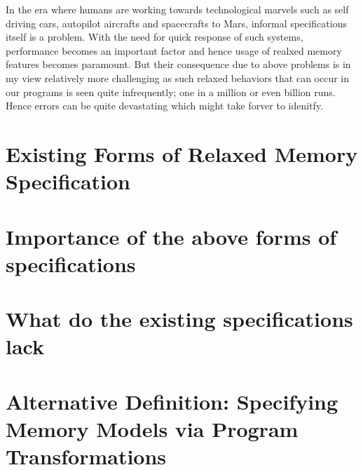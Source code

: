 \documentclass{article}
\begin{document}
        In the era where humans are working towards technological marvels such as self driving cars, autopilot aircrafts and spacecrafts to Mars, informal specifications itself is a problem. With the need for quick response of such systems, performance becomes an important factor and hence usage of realxed memory features becomes paramount. But their consequence due to above problems is in my view relatively more challenging as such relaxed behaviors that can occur in our programs is seen quite infrequently; one in a million or even billion runs. Hence errors can be quite devastating which might take forver to idenitfy.

    \section{Existing Forms of Relaxed Memory Specification}


    \section{Importance of the above forms of specifications}


    \section{What do the existing specifications lack}


    \section{Alternative Definition: Specifying Memory Models via Program Transformations}
        
\end{document}
